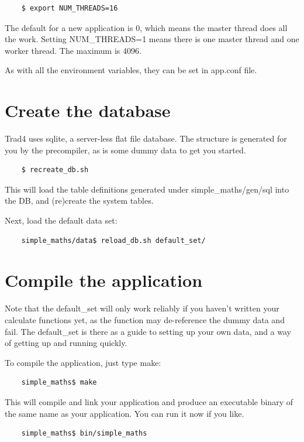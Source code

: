 \documentclass{report}
\begin{document}
\begin{verbatim}
    $ export NUM_THREADS=16
\end{verbatim}

The default for a new application is 0, which means the master thread does all the work. Setting NUM_THREADS=1 means there is one master thread and one worker thread. The maximum is 4096.

As with all the environment variables, they can be set in app.conf file.


\section{Create the database}

Trad4 uses sqlite, a server-less flat file database. The structure is generated for you by the precompiler, as is some dummy data to get you started.

\begin{verbatim}
    $ recreate_db.sh
\end{verbatim}

This will load the table definitions generated under simple_maths/gen/sql into the DB, and (re)create the 
system tables.

Next, load the default data set:

\begin{verbatim}
    simple_maths/data$ reload_db.sh default_set/
\end{verbatim}

\section{Compile the application}

Note that the default_set will only work reliably if you haven't written your calculate functions yet, as the function may de-reference the dummy data and fail. The default_set is there as a guide to setting up your own data, and a way of getting up and running quickly.

To compile the application, just type make:

\begin{verbatim}
    simple_maths$ make
\end{verbatim}

This will compile and link your application and produce an executable binary of the same name as your 
application. You can run it now if you like. 

\begin{verbatim}
    simple_maths$ bin/simple_maths
\end{verbatim}
\end{document}
